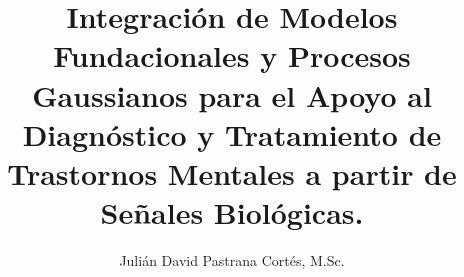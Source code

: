 \usepackage[es-tabla]{babel}
\usepackage{parskip}
\usepackage[capitalise, noabbrev]{cleveref}



\title{
	\textbf{
		Integración de Modelos Fundacionales y Procesos Gaussianos para el Apoyo al Diagnóstico y Tratamiento de Trastornos Mentales a partir de Señales Biológicas.
	}
	}
\author{
	Julián David Pastrana Cortés, M.Sc.
	}


\date{}
